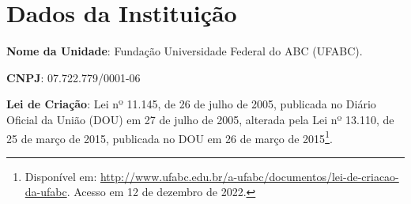 \section{Dados da Instituição}
\label{sec:dados_instituicao}

\textbf{Nome da Unidade}: Fundação Universidade Federal do ABC (UFABC).

\textbf{CNPJ}: 07.722.779/0001-06

\textbf{Lei de Criação}: Lei nº 11.145, de 26 de julho de 2005, publicada no
Diário Oficial da União (DOU) em 27 de julho de 2005, alterada pela Lei nº
13.110, de 25 de março de 2015, publicada no DOU em 26 de março de
2015\footnote{Disponível em:
\url{http://www.ufabc.edu.br/a-ufabc/documentos/lei-de-criacao-da-ufabc}.
Acesso em 12 de dezembro de 2022.}.
